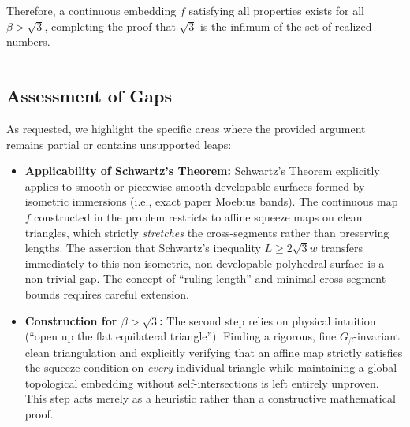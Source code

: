 \documentclass[12pt]{article}
\begin{document}
Therefore, a continuous embedding $f$ satisfying all properties exists for all $\beta > \sqrt{3}$, completing the proof that $\sqrt{3}$ is the infimum of the set of realized numbers.

\vspace{2em}
\hrule
\vspace{1em}

\subsection*{Assessment of Gaps}

As requested, we highlight the specific areas where the provided argument remains partial or contains unsupported leaps:

\begin{itemize}
    \item \textbf{Applicability of Schwartz's Theorem:} Schwartz's Theorem explicitly applies to smooth or piecewise smooth developable surfaces formed by isometric immersions (i.e., exact paper Moebius bands). The continuous map $f$ constructed in the problem restricts to affine squeeze maps on clean triangles, which strictly \emph{stretches} the cross-segments rather than preserving lengths. The assertion that Schwartz's inequality $L \ge 2\sqrt{3}w$ transfers immediately to this non-isometric, non-developable polyhedral surface is a non-trivial gap. The concept of ``ruling length'' and minimal cross-segment bounds requires careful extension.
    \item \textbf{Construction for $\beta > \sqrt{3}$:} The second step relies on physical intuition (``open up the flat equilateral triangle''). Finding a rigorous, fine $G_{\beta}$-invariant clean triangulation and explicitly verifying that an affine map strictly satisfies the squeeze condition on \emph{every} individual triangle while maintaining a global topological embedding without self-intersections is left entirely unproven. This step acts merely as a heuristic rather than a constructive mathematical proof.
\end{itemize}
\end{document}
